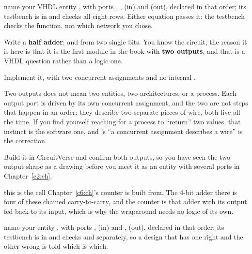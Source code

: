 
\selfcheck name your VHDL entity , with ports , ,  (in) and
 (out), declared in that order; its testbench is in  and checks
all eight rows. Either equation passes it: the testbench checks the function, not which network
you chose.

\label{c1:ex:5}
Write a \textbf{half adder}:  and  from two single bits. You know the circuit;
the reason it is here is that it is the first module in the book with \textbf{two outputs}, and that
is a VHDL question rather than a logic one.

\begin{parts}
  \item Implement it, with two concurrent assignments and no internal .

    Two outputs does not mean two entities, two architectures, or a process. Each output port is
    driven by its own concurrent assignment, and the two are not steps that happen in an order:
    they describe two separate pieces of wire, both live all the time. If you find yourself
    reaching for a process to ``return'' two values, that instinct is the software one, and
    's ``a concurrent assignment describes a wire'' is the correction.
  \item Build it in CircuitVerse and confirm both outputs, so you have seen the two-output shape as
    a drawing before you meet it as an entity with several  ports in
    Chapter~\ref{c2:ch}.
\end{parts}
 this is the cell Chapter~\ref{c6:ch}'s counter is built from. The 4-bit adder
there is four of these chained carry-to-carry, and the counter is that adder with its output fed
back to its input, which is why the wraparound needs no logic of its own.


\selfcheck name your entity , with ports ,  (in) and ,
 (out), declared in that order; its testbench is in  and
checks  and  separately, so a design that has one right and the other wrong is
told which is which.

\label{c1:set:3}

